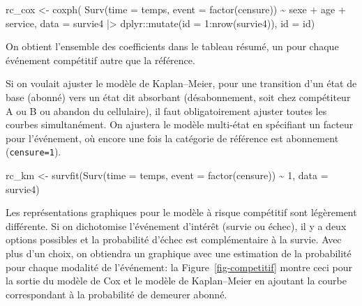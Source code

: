 \documentclass[
  11pt,
  letterpaper,
]{scrbook}
\newenvironment{Shaded}{\begin{snugshade}}{\end{snugshade}}
\newcommand{\AttributeTok}[1]{\textcolor[rgb]{0.40,0.45,0.13}{#1}}
\newcommand{\DecValTok}[1]{\textcolor[rgb]{0.68,0.00,0.00}{#1}}
\newcommand{\FunctionTok}[1]{\textcolor[rgb]{0.28,0.35,0.67}{#1}}
\newcommand{\NormalTok}[1]{\textcolor[rgb]{0.00,0.23,0.31}{#1}}
\newcommand{\OtherTok}[1]{\textcolor[rgb]{0.00,0.23,0.31}{#1}}
\newcommand{\SpecialCharTok}[1]{\textcolor[rgb]{0.37,0.37,0.37}{#1}}
\theoremstyle{definition}
\theoremstyle{remark}
\begin{document}
\begin{Shaded}
\begin{Highlighting}[]
\NormalTok{rc\_cox }\OtherTok{\textless{}{-}} \FunctionTok{coxph}\NormalTok{(}
  \FunctionTok{Surv}\NormalTok{(}\AttributeTok{time =}\NormalTok{ temps, }
       \AttributeTok{event =} \FunctionTok{factor}\NormalTok{(censure)) }\SpecialCharTok{\textasciitilde{}}\NormalTok{ sexe }\SpecialCharTok{+}\NormalTok{ age }\SpecialCharTok{+}\NormalTok{ service,}
  \AttributeTok{data =}\NormalTok{ survie4 }\SpecialCharTok{|\textgreater{}}
\NormalTok{    dplyr}\SpecialCharTok{::}\FunctionTok{mutate}\NormalTok{(}\AttributeTok{id =} \DecValTok{1}\SpecialCharTok{:}\FunctionTok{nrow}\NormalTok{(survie4)),}
  \AttributeTok{id =}\NormalTok{ id)}
\end{Highlighting}
\end{Shaded}

On obtient l'ensemble des coefficients dans le tableau résumé, un pour
chaque événement compétitif autre que la référence.

Si on voulait ajuster le modèle de Kaplan--Meier, pour une transition
d'un état de base (abonné) vers un état dit absorbant (désabonnement,
soit chez compétiteur A ou B ou abandon du cellulaire), il faut
obligatoirement ajuster toutes les courbes simultanément. On ajustera le
modèle multi-état en spécifiant un facteur pour l'événement, où encore
une fois la catégorie de référence est abonnement (\texttt{censure=1}).

\begin{Shaded}
\begin{Highlighting}[]
\NormalTok{rc\_km }\OtherTok{\textless{}{-}} \FunctionTok{survfit}\NormalTok{(}\FunctionTok{Surv}\NormalTok{(}\AttributeTok{time =}\NormalTok{ temps, }
             \AttributeTok{event =} \FunctionTok{factor}\NormalTok{(censure)) }\SpecialCharTok{\textasciitilde{}} \DecValTok{1}\NormalTok{,}
             \AttributeTok{data =}\NormalTok{ survie4)}
\end{Highlighting}
\end{Shaded}

Les représentations graphiques pour le modèle à risque compétitif sont
légèrement différente. Si on dichotomise l'événement d'intérêt (survie
ou échec), il y a deux options possibles et la probabilité d'échec est
complémentaire à la survie. Avec plus d'un choix, on obtiendra un
graphique avec une estimation de la probabilité pour chaque modalité de
l'événement: la Figure~\ref{fig-competitif} montre ceci pour la sortie
du modèle de Cox et le modèle de Kaplan--Meier en ajoutant la courbe
correspondant à la probabilité de demeurer abonné.
\end{document}
